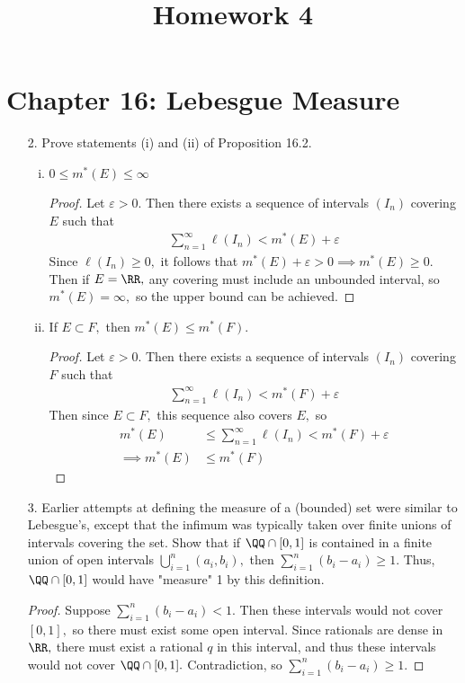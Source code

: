 \documentclass{article}
\begin{document}
\title{Homework 4}
\maketitle
\thispagestyle{fancy}

\section*{Chapter 16: Lebesgue Measure}

\begin{itemize}
	\item[2.] Prove statements (i) and (ii) of Proposition 16.2.
		\begin{enumerate}[(i)]
			\item $0\le m^*(E)\le \infty$
				\begin{proof}
					Let $\varepsilon>0.$ Then there exists a sequence of intervals $(I_n)$ covering $E$ such that
					\begin{align*}
						\sum_{n=1}^{\infty} \ell(I_n) < m^*(E) + \varepsilon
					\end{align*}
					Since $\ell(I_n)\ge 0,$ it follows that $m^*(E)+\varepsilon>0\implies m^*(E)\ge 0.$ Then if $E=\RR,$ any covering must include an unbounded interval, so $m^*(E) = \infty,$ so the upper bound can be achieved.
				\end{proof}

			\item If $E\subset F,$ then $m^*(E)\le m^*(F).$
				\begin{proof}
					Let $\varepsilon>0.$ Then there exists a sequence of intervals $(I_n)$ covering $F$ such that
					\begin{align*}
						\sum_{n=1}^{\infty} \ell(I_n) < m^*(F) + \varepsilon
					\end{align*}
					Then since $E\subset F,$ this sequence also covers $E,$ so
					\begin{align*}
						m^*(E) &\le \sum_{n=1}^{\infty} \ell(I_n) < m^*(F) + \varepsilon \\
						\implies m^*(E) &\le m^*(F)
					\end{align*}
				\end{proof}

		\end{enumerate}

	\item[3.] Earlier attempts at defining the measure of a (bounded) set were similar to Lebesgue's, except that the infimum was typically taken over finite unions of intervals covering the set. Show that if $\QQ\cap[0, 1]$ is contained in a finite union of open intervals $\bigcup_{i=1}^n (a_i, b_i),$ then $\sum_{i=1}^{n} (b_i-a_i)\ge 1.$ Thus, $\QQ\cap[0, 1]$ would have "measure" 1 by this definition.
		\begin{proof}
			Suppose $\sum_{i=1}^{n} (b_i-a_i)<1.$ Then these intervals would not cover $[0, 1],$ so there must exist some open interval. Since rationals are dense in $\RR,$ there must exist a rational $q$ in this interval, and thus these intervals would not cover $\QQ\cap [0, 1].$ Contradiction, so $\sum_{i=1}^{n} (b_i-a_i)\ge 1.$
		\end{proof}


\end{itemize}
\end{document}

